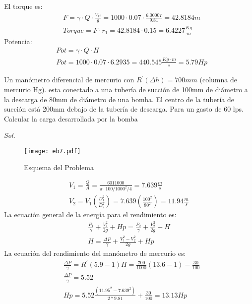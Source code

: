 El torque es:
\begin{align*}
    &F = \gamma \cdot Q \cdot \frac{V_{1t}}{g} = 1000 \cdot 0.07 \cdot \frac{6.00007 }{9.81} = 42.8184m\\
    &Torque = F \cdot r_1 = 42.8184 \cdot 0.15 = 6.4227 \frac{Kg}{m}
\end{align*}
Potencia:
\begin{align*}
    &Pot = \gamma \cdot Q \cdot H\\
    &Pot = 1000 \cdot 0.07 \cdot 6.2935 =440.545 \frac{Kg \cdot m}{s} = 5.79 Hp
\end{align*}

\begin{example}
    Un manómetro diferencial de mercurio con $R^{\prime}\left(\Delta h\right) = 700mm$ (columna de mercurio Hg). esta conectado a una tubería de succión de 100mm de diámetro a la descarga de 80mm de diámetro de una bomba. El centro de la tubería de succión está 200mm debajo de la tubería de descarga. Para un gasto de 60 lps. Calcular la carga desarrollada por la bomba
\end{example}
\textit{ Sol.}
\begin{figure}[h!]
\centering
  \texttt{[image: eb7.pdf]}
  \caption{Esquema del Problema}
  \label{eb7}
\end{figure}
\begin{align*}
    V_1 = \frac{Q}{A} = \frac{6011000}{\pi\cdot 100 / 1000^2 / 4} = 7.639 \frac{m}{s}\\
    V_2= V_1\left(\frac{D^2_1}{D^2_2}\right) = 7.639\left(\frac{100^2}{80^2}\right) = 11.94 \frac{m}{s}
\end{align*}
La ecuación general de la energía para el rendimiento  es:
\begin{align*}
    \frac{P_1}{\gamma} + \frac{V^2_1}{2g} + Hp = \frac{P_2}{\gamma} + \frac{V^2_2}{2g} + H\\
    H = \frac{\Delta P }{\gamma} + \frac{V^2_1 - V^2_2}{2g} + Hp
\end{align*}
La ecuación del rendimiento  del manómetro de mercurio es:
\begin{align*}
    &\frac{\Delta P}{\gamma} = R^{\prime}\left(5.9 - 1\right)H = \frac{700}{1000} \left(13.6 - 1 \right) - \frac{30}{100}\\
    &\frac{\Delta P}{\gamma} = 5.52\\
    &Hp = 5.52\frac{\left(11.95^2 - 7.639^2 \right)}{2*9.81} + \frac{30}{100} = 13.13Hp
\end{align*}


